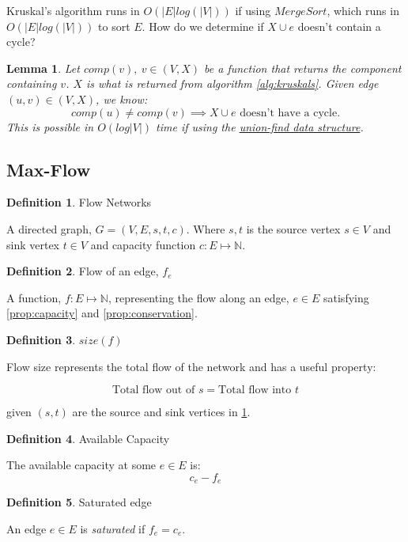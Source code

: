 \documentclass{article}
\newtheorem{lemma}[theorem]{Lemma}
\theoremstyle{definition}
\newtheorem{definition}{Definition}[section]
\begin{document}
Kruskal's algorithm runs in $O(|E|log(|V|))$ if using $MergeSort$, which runs in $O(|E|log(|V|))$ to sort $E$. How do we determine if $X \cup e$ doesn't contain a cycle? 

\begin{lemma}
	Let $comp(v), \: v \in (V,X)$ be a function that returns the component containing $v$. $X$ is what is returned from algorithm \ref{alg:kruskals}. Given edge $(u,v) \in (V,X)$, we know:
	$$comp(u) \neq comp(v) \implies X \cup e \text{ doesn't have a cycle.}$$
	This is possible in $O(log|V|)$ time if using the \href{https://en.wikipedia.org/wiki/Disjoint-set_data_structure}{union-find data structure}.
\end{lemma}

\subsection{Max-Flow}
\begin{definition}{Flow Networks}
\label{def:flow_networks}

A directed graph, $G = (V, E, s, t, c)$. Where $s, t$ is the source vertex $s \in V$ and sink vertex $t \in V$ and capacity function $c:E \mapsto \mathbb{N}$.
\end{definition}


\begin{definition}{Flow of an edge, $f_e$}
\label{prop:flow_edge}
	
A function, $f:E \mapsto \mathbb{N}$, representing the flow along an edge, $e \in E$ satisfying \ref{prop:capacity} and \ref{prop:conservation}.
\end{definition}

\begin{definition}{$size(f)$}
\label{prop:size}
	
Flow size represents the total flow of the network and has a useful property:
	
$$\text{Total flow out of } s = \text{Total flow into } t$$
	
given $(s, t)$ are the source and sink vertices in \ref{def:flow_networks}.
\end{definition}

\begin{definition}{Available Capacity}
\label{def:available_cap}

The available capacity at some $e \in E$ is:
$$c_e - f_e$$
\end{definition}

\begin{definition}{Saturated edge}
\label{def:sat_edge}

An edge $e \in E$ is \textit{saturated} if $f_e = c_e$.
\end{definition}
\end{document}

